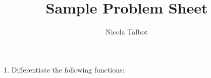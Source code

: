 \documentclass[a4paper]{article}
\begin{document}
\title{Sample Problem Sheet}
\author{Nicola Talbot}
\maketitle

\begin{enumerate}

\item Differentiate the following functions:
\newcount\oldseed
\PSNgetrandseed\oldseed
\begin{enumerate}
\end{enumerate}
\PSNrandseed\oldseed





\end{enumerate}
\end{document}
